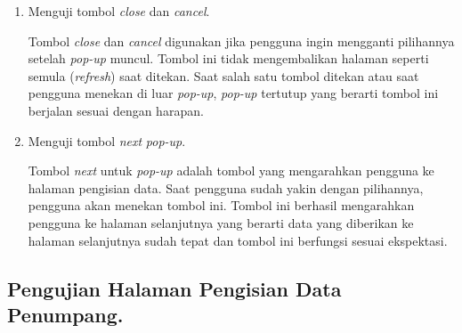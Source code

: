 \begin{enumerate}
        \item Menguji tombol \textit{close} dan \textit{cancel}.
        
        Tombol \textit{close} dan \textit{cancel} digunakan jika pengguna ingin mengganti pilihannya setelah \textit{pop-up} muncul. Tombol ini tidak mengembalikan halaman seperti semula (\textit{refresh}) saat ditekan. Saat salah satu tombol ditekan atau saat pengguna menekan di luar \textit{pop-up}, \textit{pop-up} tertutup yang berarti tombol ini berjalan sesuai dengan harapan.
        
        \item Menguji tombol \textit{next} \textit{pop-up}.
        
        Tombol \textit{next} untuk \textit{pop-up} adalah tombol yang mengarahkan pengguna ke halaman pengisian data. Saat pengguna sudah yakin dengan pilihannya, pengguna akan menekan tombol ini. Tombol ini berhasil mengarahkan pengguna ke halaman selanjutnya yang berarti data yang diberikan ke halaman selanjutnya sudah tepat dan tombol ini berfungsi sesuai ekspektasi.
        
    \end{enumerate}
    
\subsection{Pengujian Halaman Pengisian Data Penumpang.}
\label{subsec:pengujianisidata}

